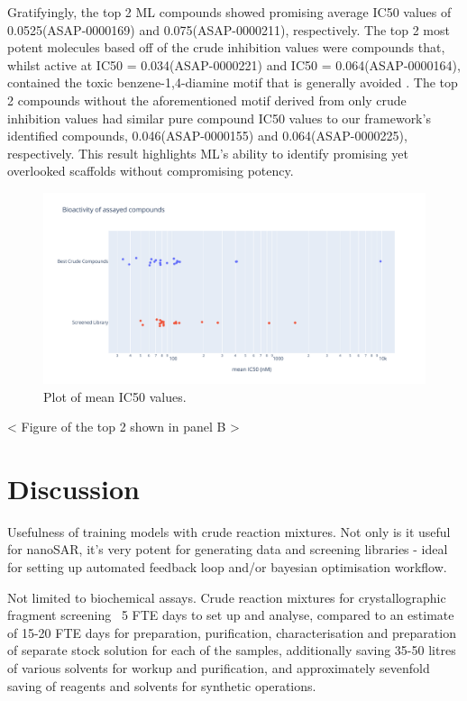 Gratifyingly, the top 2 ML compounds showed promising average IC50 values of 0.0525\uM (ASAP-0000169) and 0.075\uM (ASAP-0000211), respectively. The top 2 most potent molecules based off of the crude inhibition values were compounds that, whilst active at IC50 = 0.034\uM (ASAP-0000221) and IC50 = 0.064\uM (ASAP-0000164), contained the toxic benzene-1,4-diamine motif that is generally avoided \cite{Kumar2011diallinine}. The top 2 compounds without the aforementioned motif derived from only crude inhibition values had similar pure compound IC50 values to our framework's identified compounds, 0.046\uM (ASAP-0000155) and 0.064\uM (ASAP-0000225), respectively. This result highlights ML's ability to identify promising yet overlooked scaffolds without compromising potency. 

\begin{figure}
    \centering
             \includegraphics[width=\textwidth]{Chapters/Crude/Figs/strip_plot.pdf}
        \caption{Plot of mean IC50 values.}
        \label{fig:strip}
    \end{figure}

< Figure of the top 2 shown in panel B >

\section{Discussion}

Usefulness of training models with crude reaction mixtures. Not only is it useful for nanoSAR, it's very potent for generating data and screening libraries - ideal for setting up automated feedback loop and/or bayesian optimisation workflow.

Not limited to biochemical assays. Crude reaction mixtures for crystallographic fragment screening ~5 FTE days to set up and analyse, compared to an estimate of 15-20 FTE days for preparation, purification, characterisation and preparation of separate stock solution for each of the samples, additionally saving 35-50 litres of various solvents for workup and purification, and approximately sevenfold saving of reagents and solvents for synthetic operations. \cite{Baker2020FragementsFromCrude}